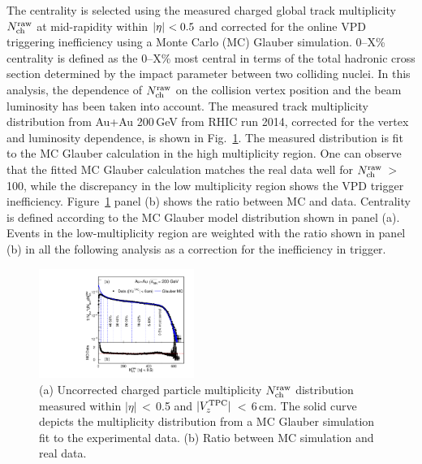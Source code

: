 \documentclass[%
 reprint,	
 amsmath,amssymb,
 aps,
 prc,
]{revtex4-1}
\begin{document}
The centrality is selected using the measured charged global track multiplicity $N_{\rm ch}^{\rm raw}$ at mid-rapidity within $|\eta|\ \rm{ < 0.5}$ and corrected for the online VPD triggering inefficiency using a Monte Carlo (MC) Glauber simulation. 0--X\% centrality is defined as the 0--X\% most central in terms of the total hadronic cross section determined by the impact parameter between two colliding nuclei. In this analysis, the dependence of $N_{\rm ch}^{\rm raw}$ on the collision vertex position and the beam luminosity has been taken into account. The measured track multiplicity distribution from Au+Au 200\,GeV from RHIC run 2014, corrected for the vertex and luminosity dependence, is shown in Fig.~\ref{fig:centrality}. The measured distribution is fit to the MC Glauber calculation in the high multiplicity region. One can observe that the fitted MC Glauber calculation matches the real data well for $N_{\rm ch}^{\rm raw}$\,$>$\,100, while the discrepancy in the low multiplicity region shows the VPD trigger inefficiency. Figure~\ref{fig:centrality} panel (b) shows the ratio between MC and data. Centrality is defined according to the MC Glauber model distribution shown in panel (a). Events in the low-multiplicity region are weighted with the ratio shown in panel (b) in all the following analysis as a correction for the inefficiency in trigger. 

\begin{figure}[h]
\centering
\includegraphics[width=0.45\textwidth]{fig/centrality.pdf}
  \caption{(a) Uncorrected charged particle multiplicity $N_{\rm ch}^{\rm raw}$ distribution measured within $|\eta|$\,$<$\,0.5 and $|V_z^{\rm{TPC}}|$\,$<$\,6\,cm. The solid curve depicts the multiplicity distribution from a MC Glauber simulation fit to the experimental data. (b) Ratio between MC simulation and real data.}
\label{fig:centrality} 
\end{figure}
\end{document}
